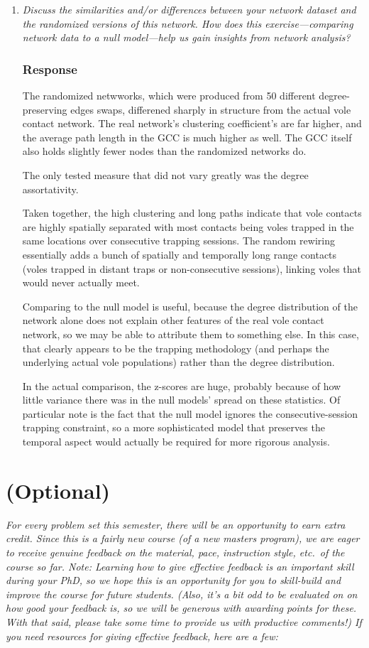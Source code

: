 \documentclass{article}
\newcommand{\response}{\subsubsection*{Response}}
\begin{document}
\begin{enumerate}[label=(\alph*)]
    \item \textit{Discuss the similarities and/or differences between your network dataset and the randomized versions of this network. How does this exercise---comparing network data to a null model---help us gain insights from network analysis?}
    \response

    The randomized netwworks, which were produced from 50 different degree-preserving edges swaps, differened sharply in structure from the actual vole contact network. The real network's clustering coefficient's are far higher, and the average path length in the GCC is much higher as well. The GCC itself also holds slightly fewer nodes than the randomized networks do. 

    The only tested measure that did not vary greatly was the degree assortativity. 

    Taken together, the high clustering and long paths indicate that vole contacts are highly spatially separated with most contacts being voles trapped in the same locations over consecutive trapping sessions. The random rewiring essentially adds a bunch of spatially and temporally long range contacts (voles trapped in distant traps or non-consecutive sessions), linking voles that would never actually meet. 

    Comparing to the null model is useful, because the degree distribution of the network alone does not explain other features of the real vole contact network, so we may be able to attribute them to something else. In this case, that clearly appears to be the trapping methodology (and perhaps the underlying actual vole populations) rather than the degree distribution. 

    In the actual comparison, the z-scores are huge, probably because of how little variance there was in the null models' spread on these statistics. Of particular note is the fact that the null model ignores the consecutive-session trapping constraint, so a more sophisticated model that preserves the temporal aspect would actually be required for more rigorous analysis. 

\end{enumerate}

\clearpage

\section{(Optional)}

\textit{For every problem set this semester, there will be an opportunity to earn extra credit. Since this is a fairly new course (of a new masters program), we are eager to receive genuine feedback on the material, pace, instruction style, etc.\ of the course so far. Note: Learning how to give effective feedback is an important skill during your PhD, so we hope this is an opportunity for you to skill-build and improve the course for future students. (Also, it's a bit odd to be evaluated on on how good your feedback is, so we will be generous with awarding points for these. With that said, please take some time to provide us with productive comments!) If you need resources for giving effective feedback, here are a few:}
\end{document}
